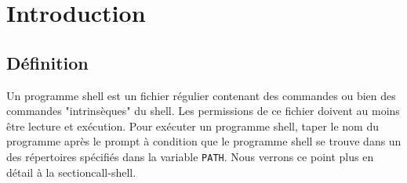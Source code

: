 %
%

\setcounter{remarque-cnt}{1}
\setcounter{example-cnt}{1}
\chapter{Introduction}
\thispagestyle{fancy}

\section{D{\'e}finition}

Un programme shell est un fichier r{\'e}gulier
contenant des commandes {\Unix} ou bien des commandes
"intrins{\`e}ques" du shell. Les permissions de ce fichier doivent
au moins {\^e}tre lecture et ex{\'e}cution. Pour ex{\'e}cuter un
programme shell, taper le nom du programme apr{\`e}s le prompt {\`a}
condition que le programme shell se trouve dans un des r{\'e}pertoires
sp{\'e}cifi{\'e}s dans la variable 
\texttt{PATH}. Nous verrons ce point plus en d{\'e}tail {\`a} la
section{call-shell}.

